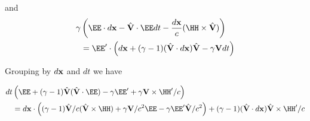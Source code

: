 and
\begin{align*}
\gamma &\left( \EE \cdot d\Bx - 
\Vcap \cdot \EE dt 
-\frac{d\Bx}{c} (\HH \cross \Vcap)
\right) \\
&=
\EE' \cdot \left(d\Bx + (\gamma-1)(\Vcap \cdot d\Bx) \Vcap - \gamma \BV dt\right)
\end{align*}

Grouping by $d\mathbf{x}$ and $dt$ we have

\begin{align*}
dt &\left(
\EE 
+ (\gamma-1) \Vcap (\Vcap \cdot \EE)
- \gamma \EE' 
+ \gamma \BV \cross \HH'/c 
\right)
\\
&=
d\Bx \cdot \left(
(\gamma-1) \Vcap/c (\Vcap \cross \HH)
+ \gamma \BV/c^2 \EE 
- \gamma \EE' \Vcap/c^2 
\right)
+ (\gamma-1)(\Vcap \cdot d\Bx) \Vcap \cross \HH'/c
\end{align*}


\EndArticle
